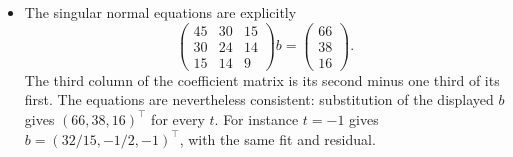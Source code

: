 \begin{example}
\begin{itemize}
  For \(b=(b_1,b_2,b_3)^\top\),
  \[
  \widetilde A b=A\binom{b_1-b_3/3}{b_2+b_3}.
  \]
  Because \(A\) has independent columns, this equals \(\hat y\)
  exactly when \(b_1-b_3/3=37/15\) and \(b_2+b_3=-3/2\).
  Therefore all minimizing coefficients are
  \[
  b=\begin{pmatrix}37/15+t/3\\-3/2-t\\t\end{pmatrix},\qquad t\in\R.
  \]
\item The singular normal equations are explicitly
  \[
  \begin{pmatrix}45&30&15\\30&24&14\\15&14&9\end{pmatrix}b
  =\begin{pmatrix}66\\38\\16\end{pmatrix}.
  \]
  The third column of the coefficient matrix is its second minus
  one third of its first. The equations are nevertheless consistent:
  substitution of the displayed \(b\) gives \((66,38,16)^\top\)
  for every \(t\). For instance \(t=-1\) gives
  \(b=(32/15,-1/2,-1)^\top\), with the same fit and residual.
\end{itemize}
\end{example}

